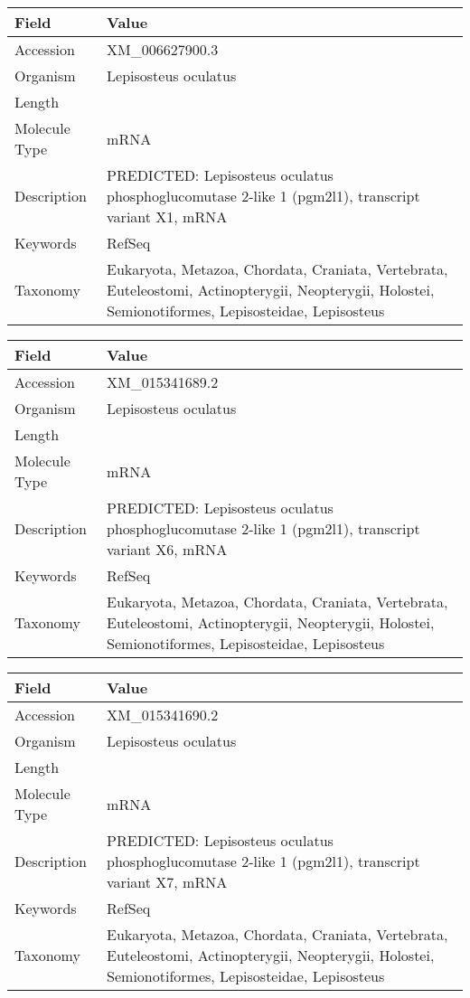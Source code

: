 \documentclass[10pt]{article}
\begin{document}
{\footnotesize
\begin{longtable}{>{\raggedright\arraybackslash}p{4.5cm} >{\raggedright\arraybackslash}p{11.5cm}}
\textbf{Field} & \textbf{Value} \\
\hline
Accession & XM\_006627900.3 \\
Organism & Lepisosteus oculatus \\
Length & 7274 \\
Molecule Type & mRNA \\
Description & PREDICTED: Lepisosteus oculatus phosphoglucomutase 2-like 1 (pgm2l1), transcript variant X1, mRNA \\
Keywords & RefSeq \\
Taxonomy & Eukaryota, Metazoa, Chordata, Craniata, Vertebrata, Euteleostomi, Actinopterygii, Neopterygii, Holostei, Semionotiformes, Lepisosteidae, Lepisosteus \\
\end{longtable}
}

{\footnotesize
\begin{longtable}{>{\raggedright\arraybackslash}p{4.5cm} >{\raggedright\arraybackslash}p{11.5cm}}
\textbf{Field} & \textbf{Value} \\
\hline
Accession & XM\_015341689.2 \\
Organism & Lepisosteus oculatus \\
Length & 6873 \\
Molecule Type & mRNA \\
Description & PREDICTED: Lepisosteus oculatus phosphoglucomutase 2-like 1 (pgm2l1), transcript variant X6, mRNA \\
Keywords & RefSeq \\
Taxonomy & Eukaryota, Metazoa, Chordata, Craniata, Vertebrata, Euteleostomi, Actinopterygii, Neopterygii, Holostei, Semionotiformes, Lepisosteidae, Lepisosteus \\
\end{longtable}
}

{\footnotesize
\begin{longtable}{>{\raggedright\arraybackslash}p{4.5cm} >{\raggedright\arraybackslash}p{11.5cm}}
\textbf{Field} & \textbf{Value} \\
\hline
Accession & XM\_015341690.2 \\
Organism & Lepisosteus oculatus \\
Length & 6904 \\
Molecule Type & mRNA \\
Description & PREDICTED: Lepisosteus oculatus phosphoglucomutase 2-like 1 (pgm2l1), transcript variant X7, mRNA \\
Keywords & RefSeq \\
Taxonomy & Eukaryota, Metazoa, Chordata, Craniata, Vertebrata, Euteleostomi, Actinopterygii, Neopterygii, Holostei, Semionotiformes, Lepisosteidae, Lepisosteus \\
\end{longtable}
}
\end{document}
